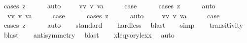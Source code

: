 \begin{isabellebody}
\ {\isacharparenleft}cases\ z{\isacharparenright}\isanewline
\ \ \ \ \isamarkupfalse%
\ auto\isanewline
{}\isamarkupfalse%
\isanewline
\ \ \isamarkupfalse%
\ {\isacharparenleft}{\isachardoublequoteopen}{}{}{\isacharunderscore}{}{\isachardoublequoteclose}\ vv\ v\ va{\isacharparenright}\isanewline
\ \ \isamarkupfalse%
\ \isamarkupfalse%
\ {\isacharquery}case\isanewline
\ \ \ \ \isamarkupfalse%
\ {\isacharparenleft}cases\ z{\isacharparenright}\isanewline
\ \ \ \ \isamarkupfalse%
\ auto\isanewline
{}\isamarkupfalse%
\isanewline
\ \ \isamarkupfalse%
\ {\isacharparenleft}{\isachardoublequoteopen}{}{}{\isacharunderscore}{}{\isachardoublequoteclose}\ vv\ v\ va{\isacharparenright}\isanewline
\ \ \isamarkupfalse%
\ \isamarkupfalse%
\ {\isacharquery}case\isanewline
\ \ \ \ \isamarkupfalse%
\ {\isacharparenleft}cases\ z{\isacharparenright}\isanewline
\ \ \ \ \isamarkupfalse%
\ auto\isanewline
{}\isamarkupfalse%
\isanewline
\ \ \isamarkupfalse%
\ {\isacharparenleft}{\isachardoublequoteopen}{}{}{\isacharunderscore}{}{\isachardoublequoteclose}\ vv\ v\ va{\isacharparenright}\isanewline
\ \ \isamarkupfalse%
\ \isamarkupfalse%
\ {\isacharquery}case\isanewline
\ \ \ \ \isamarkupfalse%
\ {\isacharparenleft}cases\ z{\isacharparenright}\isanewline
\ \ \ \ \isamarkupfalse%
\ auto\isanewline
{}\isamarkupfalse%
%
\endisatagproof
{\isafoldproof}%
%
\isadelimproof
\isanewline
%
\endisadelimproof
\isanewline
{}\isamarkupfalse%
\isanewline
%
\isadelimproof
\ \ %
\endisadelimproof
%
\isatagproof
{}\isamarkupfalse%
\ standard\isanewline
\ \ \isamarkupfalse%
\ hard{\isacharunderscore}less\ \isamarkupfalse%
\ blast\isanewline
\ \ \isamarkupfalse%
\ simp\isanewline
\ \ \isamarkupfalse%
\ transitivity\ \isamarkupfalse%
\ blast\isanewline
\ \ \isamarkupfalse%
\ antisymmetry\ \isamarkupfalse%
\ blast\isanewline
\ \ \isamarkupfalse%
\ x{\isacharunderscore}leq{\isacharunderscore}y{\isacharunderscore}or{\isacharunderscore}y{\isacharunderscore}lex{\isacharunderscore}x\ \isamarkupfalse%
\ auto%
\endisatagproof
{\isafoldproof}%
%
\isadelimproof
\isanewline
%
\endisadelimproof
{}\isamarkupfalse%
\isanewline
%
\isadelimtheory
\isanewline
%
\endisadelimtheory
%
\isatagtheory
{}\isamarkupfalse%
%
\endisatagtheory
{\isafoldtheory}%
%
\isadelimtheory
%
\endisadelimtheory
%
\end{isabellebody}%
